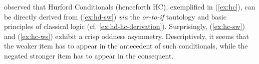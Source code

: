 \citet{Mandelkern2018} observed that Hurford Conditionals (henceforth HC), exemplified in (\ref{ex:hc}), can be directly derived from (\ref{ex:hd-sw}) \textit{via} the \textit{or-to-if} tautology and basic principles of classical logic (cf. \ref{ex:hd-hc-derivation}). Surprisingly, (\ref{ex:hc-sw}) and (\ref{ex:hc-ws}) exhibit a crisp oddness asymmetry. Descriptively, it seems that the weaker item has to appear in the antecedent of such conditionals, while the negated stronger item has to appear in the consequent.

\begin{exe}
	\ex \label{ex:hc}
	\begin{xlist}
		\label{ex:hc-sw}
		\label{ex:hc-ws}
	\end{xlist}
\end{exe}

